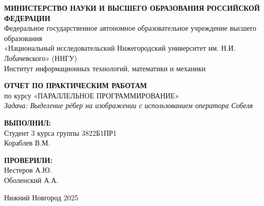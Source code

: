 \documentclass[14pt,a4paper]{extarticle}
\begin{document}
\begin{titlepage}
\begin{center}

\onehalfspacing

\begin{center}
    \textbf{МИНИСТЕРСТВО НАУКИ И ВЫСШЕГО ОБРАЗОВАНИЯ РОССИЙСКОЙ ФЕДЕРАЦИИ} \\
    Федеральное государственное автономное образовательное учреждение высшего образования \\
    «Национальный исследовательский Нижегородский университет им. Н.И. Лобачевского» (ННГУ) \\
    Институт информационных технологий, математики и механики
\end{center}

\vspace{4cm}

\begin{center}
    \textbf{ОТЧЕТ ПО ПРАКТИЧЕСКИМ РАБОТАМ} \vspace{0.5cm}\\
    по курсу «ПАРАЛЛЕЛЬНОЕ ПРОГРАММИРОВАНИЕ» \vspace{0.5cm}\\
    \textit{Задача: Выделение рёбер на изображении с использованием оператора Собеля}
\end{center}

\vspace{4cm}

\begin{flushright}
    \textbf{ВЫПОЛНИЛ:} \\ 
    Студент 3 курса 
    группы 3822Б1ПР1 \\ 
    Кораблев В.М. \\

    \vspace{1cm}

    \textbf{ПРОВЕРИЛИ:} \\ 
    Нестеров А.Ю. \\ 
    Оболенский А.А.
\end{flushright}

\vspace{1cm}

\begin{center}
    Нижний Новгород 2025\newpage
\end{center}

\end{center}
\end{titlepage}

\tableofcontents
\newpage
\end{document}
